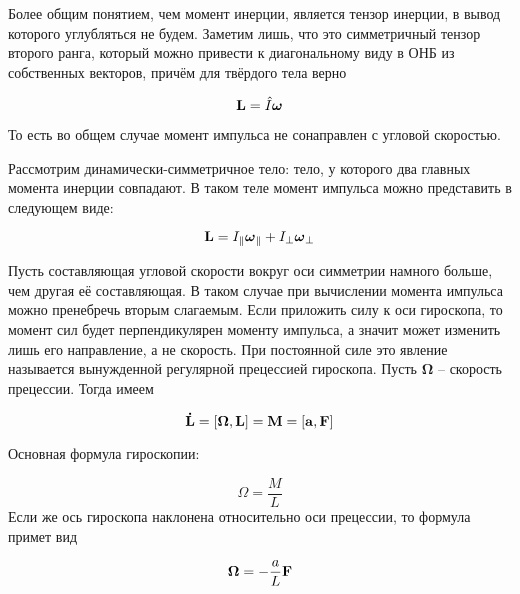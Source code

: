 Более общим понятием, чем момент инерции, является тензор инерции, в вывод которого углубляться не будем. Заметим лишь, что это симметричный тензор второго ранга, который можно привести к диагональному виду в ОНБ из собственных векторов, причём для твёрдого тела верно

\begin{equation}
    \mathbf L = \hat I \boldsymbol \omega
\end{equation}

\noindent
То есть во общем случае момент импульса не сонаправлен с угловой скоростью.

Рассмотрим динамически-симметричное тело: тело, у которого два главных момента инерции совпадают. В таком теле момент импульса можно представить в следующем виде:

\begin{equation}
    \mathbf L = I_\parallel \boldsymbol \omega_\parallel + I_\perp \boldsymbol \omega_\perp
\end{equation}

\noindent
Пусть составляющая угловой скорости вокруг оси симметрии намного больше, чем другая её составляющая. В таком случае при вычислении момента импульса можно пренебречь вторым слагаемым. Если приложить силу к оси гироскопа, то момент сил будет перпендикулярен моменту импульса, а значит может изменить лишь его направление, а не скорость. При постоянной силе это явление называется вынужденной регулярной прецессией гироскопа. Пусть $\boldsymbol \Omega$ -- скорость прецессии. Тогда имеем

\begin{equation}
    \mathbf{\dot L} = \left[ \boldsymbol \Omega, \mathbf L \right] = \mathbf M = \left[ \mathbf a, \mathbf F \right]
\end{equation}

\noindent
Основная формула гироскопии:

\begin{equation}
    \Omega = \frac{M}{L}
\end{equation}
\noindent
Если же ось гироскопа наклонена относительно оси прецессии, то формула примет вид

\begin{equation}
    \boldsymbol \Omega = - \frac{a}{L} \mathbf F
\end{equation}